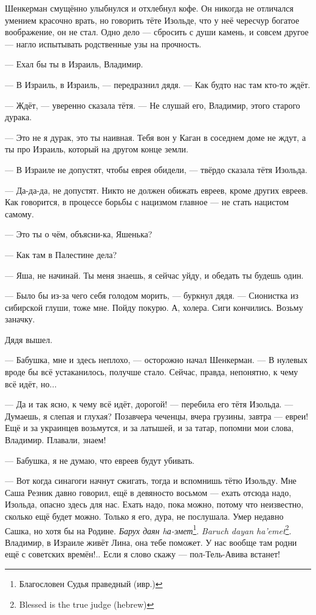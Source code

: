 Шенкерман смущённо улыбнулся и отхлебнул кофе.
Он никогда не отличался умением красочно врать, но говорить тёте Изольде, что у неё чересчур богатое воображение, он не стал.
Одно дело --- сбросить с души камень, и совсем другое --- нагло испытывать родственные узы на прочность.

\textspace

--- Ехал бы ты в Израиль, Владимир.

--- В Израиль, в Израиль, --- передразнил дядя.
--- Как будто нас там кто-то ждёт.

--- Ждёт, --- уверенно сказала тётя.
--- Не слушай его, Владимир, этого старого дурака.

--- Это не я дурак, это ты наивная.
Тебя вон у Каган в соседнем доме не ждут, а ты про Израиль, который на другом конце земли.

--- В Израиле не допустят, чтобы еврея обидели, --- твёрдо сказала тётя Изольда.

--- Да-да-да, не допустят.
Никто не должен обижать евреев, кроме других евреев.
Как говорится, в процессе борьбы с нацизмом главное --- не стать нацистом самому.

--- Это ты о чём, объясни-ка, Яшенька?

--- Как там в Палестине дела?

--- Яша, не начинай.
Ты меня знаешь, я сейчас уйду, и обедать ты будешь один.

--- Было бы из-за чего себя голодом морить, --- буркнул дядя.
--- Сионистка из сибирской глуши, тоже мне.
Пойду покурю.
А, холера.
Сиги кончились.
Возьму заначку.

Дядя вышел.

--- Бабушка, мне и здесь неплохо, --- осторожно начал Шенкерман.
--- В нулевых вроде бы всё устаканилось, получше стало.
Сейчас, правда, непонятно, к чему всё идёт, но...

--- Да и так ясно, к чему всё идёт, дорогой! --- перебила его тётя Изольда.
--- Думаешь, я слепая и глухая?
Позавчера чеченцы, вчера грузины, завтра --- евреи!
Ещё и за украинцев возьмутся, и за латышей, и за татар, попомни мои слова, Владимир.
Плавали, знаем!

--- Бабушка, я не думаю, что евреев будут убивать.

--- Вот когда синагоги начнут сжигать, тогда и вспомнишь тётю Изольду.
Мне Саша Резник давно говорил, ещё в девяносто восьмом --- ехать отсюда надо, Изольда, опасно здесь для нас.
Ехать надо, пока можно, потому что неизвестно, сколько ещё будет можно.
Только я его, дура, не послушала.
Умер недавно Сашка, но хотя бы на Родине.
{\textit{Барух даян hа-эмет}\footnote{Благословен Судья праведный (ивр.)}.}
{\textit{Baruch dayan ha'emet}\footnote{Blessed is the true judge (hebrew)}.}
Владимир, в Израиле живёт Лина, она тебе поможет.
У нас вообще там родни ещё с советских времён!..
Если я слово скажу --- пол-Тель-Авива встанет!

